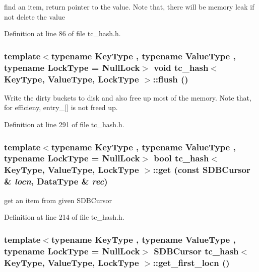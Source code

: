 find an item, return pointer to the value. Note that, there will be memory leak if not delete the value 

Definition at line 86 of file tc\_\-hash.h.\hypertarget{classtc__hash_3ffb4206aed13ea94ff623cc46d971da}{
\subsubsection[{flush}]{\setlength{\rightskip}{0pt plus 5cm}template$<$typename KeyType , typename ValueType , typename LockType  = NullLock$>$ void {\bf tc\_\-hash}$<$ KeyType, ValueType, LockType $>$::flush ()}}
\label{classtc__hash_3ffb4206aed13ea94ff623cc46d971da}


Write the dirty buckets to disk and also free up most of the memory. Note that, for efficieny, entry\_\-\mbox{[}\mbox{]} is not freed up. 

Definition at line 291 of file tc\_\-hash.h.\hypertarget{classtc__hash_43f0d4a9a0ceda515d782000b81928c3}{
\subsubsection[{get}]{\setlength{\rightskip}{0pt plus 5cm}template$<$typename KeyType , typename ValueType , typename LockType  = NullLock$>$ bool {\bf tc\_\-hash}$<$ KeyType, ValueType, LockType $>$::get (const SDBCursor \& {\em locn}, \/  DataType \& {\em rec})}}
\label{classtc__hash_43f0d4a9a0ceda515d782000b81928c3}


get an item from given SDBCursor 

Definition at line 214 of file tc\_\-hash.h.\hypertarget{classtc__hash_3c7efb056e568de793b82a30c66f9640}{
\subsubsection[{get\_\-first\_\-locn}]{\setlength{\rightskip}{0pt plus 5cm}template$<$typename KeyType , typename ValueType , typename LockType  = NullLock$>$ SDBCursor {\bf tc\_\-hash}$<$ KeyType, ValueType, LockType $>$::get\_\-first\_\-locn ()}}
\label{classtc__hash_3c7efb056e568de793b82a30c66f9640}


